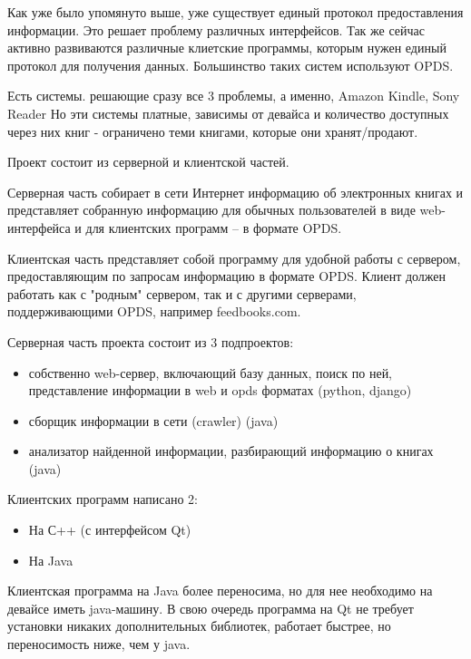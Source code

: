 \documentclass[a4paper]{report}
\begin{document}
Как уже было упомянуто выше, уже существует единый протокол предоставления информации. Это решает проблему различных интерфейсов.
Так же сейчас активно развиваются различные клиетские программы, которым нужен единый протокол для получения данных. Большинство таких систем используют OPDS.

Есть системы. решающие сразу все 3 проблемы, а именно, Amazon Kindle, Sony Reader %
Но эти системы платные, зависимы от девайса и количество доступных через них книг - ограничено теми книгами, которые они хранят/продают.



Проект состоит из серверной и клиентской частей.

Серверная часть собирает в сети Интернет информацию об электронных книгах и представляет собранную информацию для обычных пользователей в виде web-интерфейса и для клиентских программ -- в формате OPDS.

Клиентская часть представляет собой программу для удобной работы с сервером, предоставляющим по запросам информацию в формате OPDS. Клиент должен работать как с "родным" сервером, так и с другими серверами, поддерживающими OPDS, например feedbooks.com.

Серверная часть проекта состоит из 3 подпроектов:
\begin{itemize}
\item собственно web-сервер, включающий базу данных, поиск по ней, представление информации в web и opds форматах (python, django)
\item сборщик информации в сети (crawler) (java)
\item анализатор найденной информации, разбирающий информацию о книгах (java) 
\end{itemize}
Клиентских программ написано 2:
\begin{itemize}
\item На С++ (с интерфейсом Qt)
\item На Java 
\end{itemize}

Клиентская программа на Java более переносима, но для нее необходимо на девайсе иметь java-машину. В свою очередь программа на Qt не требует установки никаких дополнительных библиотек, работает быстрее, но переносимость ниже, чем у java.
		
\end{document}
